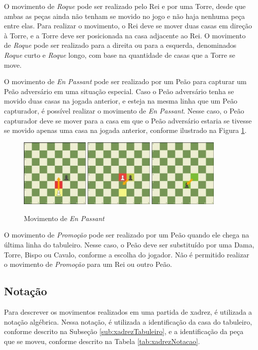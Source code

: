 O movimento de \textit{Roque} pode ser realizado pelo Rei e por uma Torre,
desde que ambas as peças ainda não tenham se movido no jogo e não haja nenhuma peça entre elas.
Para realizar o movimento, o Rei deve se mover duas casas em direção à Torre, e a Torre deve ser posicionada na casa adjacente ao Rei.
O movimento de \textit{Roque} pode ser realizado para a direita ou para a esquerda,
denominados \textit{Roque} curto e \textit{Roque} longo, com base na quantidade de casas que a Torre se move.

O movimento de \textit{En Passant} pode ser realizado por um Peão para capturar um Peão adversário em uma situação especial.
Caso o Peão adversário tenha se movido duas casas na jogada anterior, e esteja na mesma linha que um Peão capturador, é possível realizar o movimento de \textit{En Passant}.
Nesse caso, o Peão capturador deve se mover para a casa em que o Peão adversário estaria se tivesse se movido apenas uma casa na jogada anterior,
conforme ilustrado na Figura \ref{fig:xadrezEnPassant}.

\begin{figure}[H]
    \centering
    \caption{Movimento de \textit{En Passant}}
    \includegraphics[keepaspectratio=true, width=0.9\textwidth]
    	{img/xadrez-enpassant.jpeg}
    \label{fig:xadrezEnPassant}
\end{figure}

O movimento de \textit{Promoção} pode ser realizado por um Peão quando ele chega na última linha do tabuleiro.
Nesse caso, o Peão deve ser substituído por uma Dama, Torre, Bispo ou Cavalo, conforme a escolha do jogador.
Não é permitido realizar o movimento de \textit{Promoção} para um Rei ou outro Peão.

\subsection[Notação]{Notação}
\label{sub:xadrezNotacao}

Para descrever os movimentos realizados em uma partida de xadrez, é utilizada a notação algébrica.
Nessa notação, é utilizada a identificação da casa do tabuleiro, conforme descrito na Subseção \ref{sub:xadrezTabuleiro},
e a identificação da peça que se moveu, conforme descrito na Tabela \ref{tab:xadrezNotacao}.

